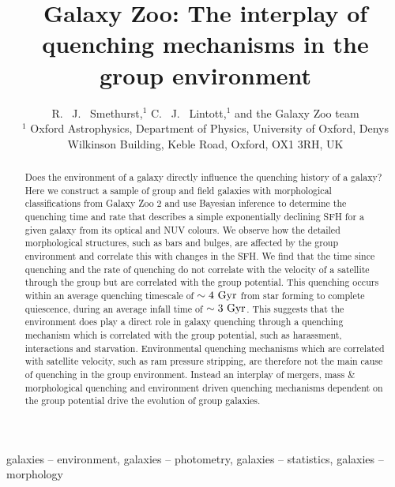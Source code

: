 \documentclass[useAMS,usenatbib]{mn2e}
\begin{document}
\title[Group environment quenching mechanisms]{Galaxy Zoo: The interplay of quenching mechanisms in the group environment}
\author[Smethurst et al. 2015]{R. ~J. ~Smethurst,$^{1}$ C. ~J. ~Lintott,$^{1}$ and the Galaxy Zoo team \footnotemark[1]
\\ $^1$ Oxford Astrophysics, Department of Physics, University of Oxford, Denys Wilkinson Building, Keble Road, Oxford, OX1 3RH, UK 
}

\maketitle

\begin{abstract}
Does the environment of a galaxy directly influence the quenching history of a galaxy? Here we construct a sample of group and field galaxies with morphological classifications from Galaxy Zoo 2 and use Bayesian inference to determine the quenching time and rate that describes a simple exponentially declining SFH for a given galaxy from its optical and NUV colours. We observe how the detailed morphological structures, such as bars and bulges, are affected by the group environment and correlate this with changes in the SFH. We find that the time since quenching and the rate of quenching do not correlate with the velocity of a satellite through the group but are correlated with the group potential. This quenching occurs within an average quenching timescale of $\sim4~\rm{Gyr}$ from star forming to complete quiescence, during an average infall time of $\sim 3 ~\rm{Gyr}$. This suggests that the environment does play a direct role in galaxy quenching through a quenching mechanism which is correlated with the group potential, such as harassment, interactions and starvation. Environmental quenching mechanisms which are correlated with satellite velocity, such as ram pressure stripping, are therefore not the main cause of quenching in the group environment. Instead an interplay of mergers, mass \& morphological quenching and environment driven quenching mechanisms dependent on the group potential drive the evolution of group galaxies. 

\end{abstract}

\begin{keywords}
galaxies -- environment, galaxies -- photometry, galaxies -- statistics, galaxies -- morphology
\end{keywords}

\end{document}
